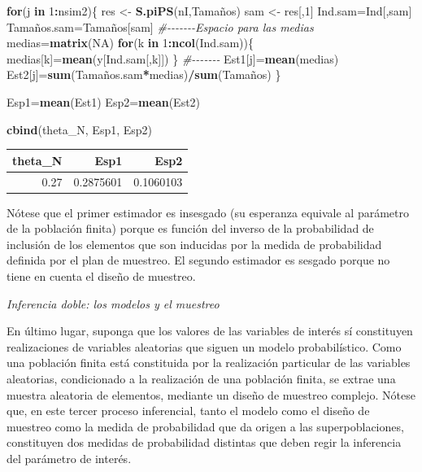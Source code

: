 \documentclass[
  spanish,
  12pt,
]{book}
\newenvironment{Shaded}{\begin{snugshade}}{\end{snugshade}}
\newcommand{\CommentTok}[1]{\textcolor[rgb]{0.56,0.35,0.01}{\textit{#1}}}
\newcommand{\ConstantTok}[1]{\textcolor[rgb]{0.56,0.35,0.01}{#1}}
\newcommand{\ControlFlowTok}[1]{\textcolor[rgb]{0.13,0.29,0.53}{\textbf{#1}}}
\newcommand{\DecValTok}[1]{\textcolor[rgb]{0.00,0.00,0.81}{#1}}
\newcommand{\FunctionTok}[1]{\textcolor[rgb]{0.13,0.29,0.53}{\textbf{#1}}}
\newcommand{\NormalTok}[1]{#1}
\newcommand{\OtherTok}[1]{\textcolor[rgb]{0.56,0.35,0.01}{#1}}
\newcommand{\SpecialCharTok}[1]{\textcolor[rgb]{0.81,0.36,0.00}{\textbf{#1}}}
\begin{document}
\begin{Shaded}
\begin{Highlighting}[]
\ControlFlowTok{for}\NormalTok{(j }\ControlFlowTok{in} \DecValTok{1}\SpecialCharTok{:}\NormalTok{nsim2)\{}
\NormalTok{res }\OtherTok{\textless{}{-}} \FunctionTok{S.piPS}\NormalTok{(nI,Tamaños)}
\NormalTok{sam }\OtherTok{\textless{}{-}}\NormalTok{ res[,}\DecValTok{1}\NormalTok{] }
\NormalTok{Ind.sam}\OtherTok{=}\NormalTok{Ind[,sam]}
\NormalTok{Tamaños.sam}\OtherTok{=}\NormalTok{Tamaños[sam]}
\CommentTok{\#{-}{-}{-}{-}{-}{-}{-}Espacio para las medias}
\NormalTok{medias}\OtherTok{=}\FunctionTok{matrix}\NormalTok{(}\ConstantTok{NA}\NormalTok{)}
\ControlFlowTok{for}\NormalTok{(k }\ControlFlowTok{in} \DecValTok{1}\SpecialCharTok{:}\FunctionTok{ncol}\NormalTok{(Ind.sam))\{}
\NormalTok{medias[k]}\OtherTok{=}\FunctionTok{mean}\NormalTok{(y[Ind.sam[,k]])}
\NormalTok{\}}
\CommentTok{\#{-}{-}{-}{-}{-}{-}{-}}
\NormalTok{Est1[j]}\OtherTok{=}\FunctionTok{mean}\NormalTok{(medias)}
\NormalTok{Est2[j]}\OtherTok{=}\FunctionTok{sum}\NormalTok{(Tamaños.sam}\SpecialCharTok{*}\NormalTok{medias)}\SpecialCharTok{/}\FunctionTok{sum}\NormalTok{(Tamaños)}
\NormalTok{\}}

\NormalTok{Esp1}\OtherTok{=}\FunctionTok{mean}\NormalTok{(Est1)}
\NormalTok{Esp2}\OtherTok{=}\FunctionTok{mean}\NormalTok{(Est2)}

\FunctionTok{cbind}\NormalTok{(theta\_N, Esp1, Esp2)}
\end{Highlighting}
\end{Shaded}

\begin{tabular}{r|r|r}
\hline
theta\_N & Esp1 & Esp2\\
\hline
0.27 & 0.2875601 & 0.1060103\\
\hline
\end{tabular}

Nótese que el primer estimador es insesgado (su esperanza equivale al parámetro de la población finita) porque es función del inverso de la probabilidad de inclusión de los elementos que son inducidas por la medida de probabilidad definida por el plan de muestreo. El segundo estimador es sesgado porque no tiene en cuenta el diseño de muestreo.

\emph{Inferencia doble: los modelos y el muestreo}

En último lugar, suponga que los valores de las variables de interés sí constituyen realizaciones de variables aleatorias que siguen un modelo probabilístico. Como una población finita está constituida por la realización particular de las variables aleatorias, condicionado a la realización de una población finita, se extrae una muestra aleatoria de elementos, mediante un diseño de muestreo complejo. Nótese que, en este tercer proceso inferencial, tanto el modelo como el diseño de muestreo como la medida de probabilidad que da origen a las superpoblaciones, constituyen dos medidas de probabilidad distintas que deben regir la inferencia del parámetro de interés.
\end{document}
